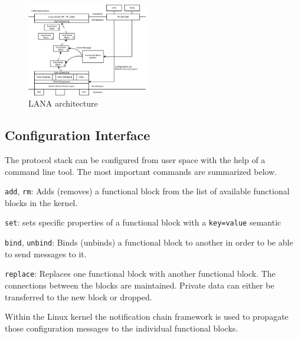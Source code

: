 \documentclass{sig-alternate}
\begin{document}
\begin{figure}
\centering
\includegraphics[width=0.47\textwidth]{figures/architecture.pdf}
\caption{LANA architecture}
\label{fig:architecture}
\end{figure}


\subsection{Configuration Interface}
The protocol stack can be configured from user space with the help of a 
command line tool. The most important commands are summarized below.
\begin{compactitem}
\item \texttt{add}, \texttt{rm}: Adds (removes) a functional block from the 
      list of available functional blocks in the kernel. 
\item \texttt{set}: sets specific properties of a functional block with a 
      \texttt{key=value} semantic
\item \texttt{bind}, \texttt{unbind}: Binds (unbinds) a functional block 
      to another in order to be able to send messages to it. 
\item \texttt{replace}: Replaces one functional block with another 
      functional block. The connections between the blocks are maintained. 
      Private data can either be transferred to the new block or dropped.
\end{compactitem}
Within the Linux kernel the notification chain framework is used to propagate those configuration messages to the individual functional blocks. 
\end{document}
